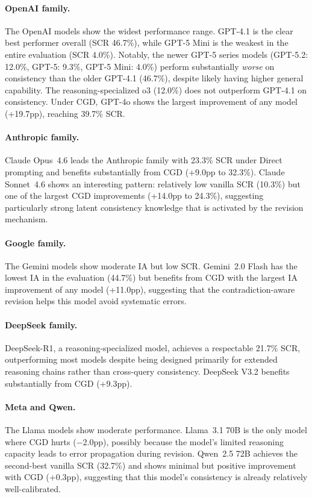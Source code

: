 \documentclass{article}
\newcommand{\method}{\textsc{CGD}}
\begin{document}
\paragraph{OpenAI family.} The OpenAI models show the widest performance range. GPT-4.1 is the clear best performer overall (SCR 46.7\%), while GPT-5 Mini is the weakest in the entire evaluation (SCR 4.0\%). Notably, the newer GPT-5 series models (GPT-5.2: 12.0\%, GPT-5: 9.3\%, GPT-5 Mini: 4.0\%) perform substantially \emph{worse} on consistency than the older GPT-4.1 (46.7\%), despite likely having higher general capability. The reasoning-specialized o3 (12.0\%) does not outperform GPT-4.1 on consistency. Under \method{}, GPT-4o shows the largest improvement of any model (+19.7pp), reaching 39.7\% SCR.

\paragraph{Anthropic family.} Claude Opus~4.6 leads the Anthropic family with 23.3\% SCR under Direct prompting and benefits substantially from \method{} (+9.0pp to 32.3\%). Claude Sonnet~4.6 shows an interesting pattern: relatively low vanilla SCR (10.3\%) but one of the largest \method{} improvements (+14.0pp to 24.3\%), suggesting particularly strong latent consistency knowledge that is activated by the revision mechanism.

\paragraph{Google family.} The Gemini models show moderate IA but low SCR. Gemini~2.0 Flash has the lowest IA in the evaluation (44.7\%) but benefits from \method{} with the largest IA improvement of any model (+11.0pp), suggesting that the contradiction-aware revision helps this model avoid systematic errors.

\paragraph{DeepSeek family.} DeepSeek-R1, a reasoning-specialized model, achieves a respectable 21.7\% SCR, outperforming most models despite being designed primarily for extended reasoning chains rather than cross-query consistency. DeepSeek V3.2 benefits substantially from \method{} (+9.3pp).

\paragraph{Meta and Qwen.} The Llama models show moderate performance. Llama~3.1 70B is the only model where \method{} hurts ($-$2.0pp), possibly because the model's limited reasoning capacity leads to error propagation during revision. Qwen~2.5 72B achieves the second-best vanilla SCR (32.7\%) and shows minimal but positive improvement with \method{} (+0.3pp), suggesting that this model's consistency is already relatively well-calibrated.
\end{document}
